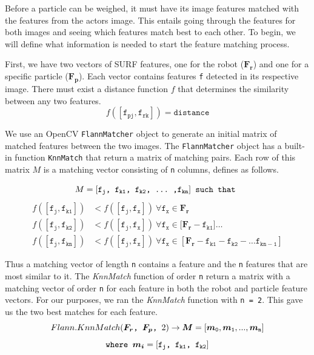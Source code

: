 \documentclass[a4paper,11pt]{article}
\begin{document}
Before a particle can be weighed, it must have its image features matched with the features from the actors image. This entails going through the features for both images and seeing which features match best to each other. To begin, we will define what information is needed to start the feature matching process. 

First, we have two vectors of SURF features, one for the robot ($\boldsymbol{F_r }$) and one for a specific particle ($\boldsymbol{F_p}$). Each vector contains features \verb.f. detected in its respective image. There must exist a distance function $f$ that determines the similarity between any two features. 
 \[ f(\mathtt{[f_{pj}, f_{rk}]}) = \mathtt{distance}\]

   We use an OpenCV \texttt{FlannMatcher} object to generate an initial matrix of matched features between the two images. The \texttt{FlannMatcher} object has a built-in function \texttt{KnnMatch} that return a matrix of matching pairs. Each row of this matrix $M$ is a matching vector consisting of \texttt{n} columns, defines as follows.

 \[ M = \mathtt{ [f_{j}} \verb., . \mathtt{f_{k1}} \verb., . \mathtt{f_{k2}} \verb-, ... ,- \mathtt{f_{kn}} ] \verb. such that . \]
\begin{align*}
f(\mathtt{[f_{j}, f_{k1}]}) &< f(\mathtt{[f_{j}, f_{x}]})  \  \forall \mathtt{ f_{x}} \in  \boldsymbol{F_r}  \  
\\  f(\mathtt{[f_{j}, f_{k2}]}) &< f(\mathtt{[f_{j}, f_{x}]})  \  \forall \mathtt{ f_{x}} \in  [\boldsymbol{F_r} - \mathtt{f_{k1}]}  \dots
\\ f(\mathtt{[f_{j}, f_{kn}]}) &< f(\mathtt{[f_{j}, f_{x}]})  \  \forall \mathtt{ f_{x}} \in  [\boldsymbol{F_r} - \mathtt{f_{k1} - \mathtt{f_{k2}} -} \dots \mathtt{f_{kn-1}}  ]
\end{align*}

 Thus a matching vector of length \texttt{n} contains a feature and the \texttt{n} features that are most similar to it. The \emph{KnnMatch} function of order \texttt{n} return a matrix with a matching vector of order \texttt{n} for each feature in both the robot and particle feature vectors. For our purposes, we ran the \emph{KnnMatch} function with \texttt{n = 2}. This gave us the two best matches for each feature.
 \[ Flann.KnnMatch(\boldsymbol{F_r} \verb., . \boldsymbol{F_p} \verb., . 2) \to \boldsymbol{M} = \mathtt{ [\boldsymbol{m}_0, \boldsymbol{m}_1, ... , \boldsymbol{m}_n ]} \]
 \[ \verb.where . \boldsymbol{m_i} = \mathtt{ [f_{j}} \verb., . \mathtt{f_{k1}} \verb., . \mathtt{f_{k2}} ]\]
\end{document}
